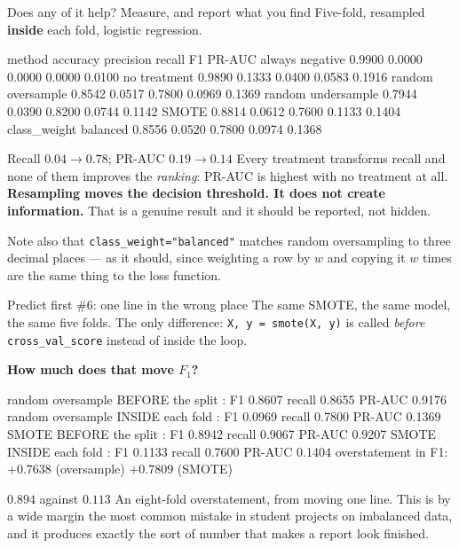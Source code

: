 \documentclass[aspectratio=169]{beamer}
\begin{document}
\begin{frame}[fragile,shrink=8]{Does any of it help? Measure, and report what you find}
Five-fold, resampled \textbf{inside} each fold, logistic regression.
\begin{outblk}
   method                 accuracy precision  recall      F1   PR-AUC
   always negative         0.9900    0.0000  0.0000  0.0000   0.0100
   no treatment            0.9890    0.1333  0.0400  0.0583   0.1916
   random oversample       0.8542    0.0517  0.7800  0.0969   0.1369
   random undersample      0.7944    0.0390  0.8200  0.0744   0.1142
   SMOTE                   0.8814    0.0612  0.7600  0.1133   0.1404
   class_weight balanced   0.8556    0.0520  0.7800  0.0974   0.1368
\end{outblk}
\begin{alertblock}{Recall $0.04 \rightarrow 0.78$; PR-AUC $0.19 \rightarrow 0.14$}
  \footnotesize Every treatment transforms recall and none of them improves
  the \emph{ranking}: PR-AUC is highest with no treatment at all.
  \textbf{Resampling moves the decision threshold. It does not create
  information.} That is a genuine result and it should be reported, not
  hidden.
\end{alertblock}
\begin{center}\small
  Note also that \texttt{class\_weight="balanced"} matches random
  oversampling to three decimal places --- as it should, since weighting a row
  by $w$ and copying it $w$ times are the same thing to the loss function.
\end{center}
\end{frame}

\begin{frame}[fragile,shrink=8]{Predict first \#6: one line in the wrong place}
The same SMOTE, the same model, the same five folds. The only difference:
\texttt{X, y = smote(X, y)} is called \emph{before} \texttt{cross\_val\_score}
instead of inside the loop.

\begin{center}
  \textbf{How much does that move $F_1$?}
\end{center}
\begin{outblk}
   random oversample  BEFORE the split : F1 0.8607  recall 0.8655  PR-AUC 0.9176
   random oversample  INSIDE each fold : F1 0.0969  recall 0.7800  PR-AUC 0.1369
   SMOTE              BEFORE the split : F1 0.8942  recall 0.9067  PR-AUC 0.9207
   SMOTE              INSIDE each fold : F1 0.1133  recall 0.7600  PR-AUC 0.1404
   overstatement in F1: +0.7638 (oversample)   +0.7809 (SMOTE)
\end{outblk}
\begin{alertblock}{$\mathbf{0.894}$ against $\mathbf{0.113}$}
  \footnotesize An eight-fold overstatement, from moving one line. This is by
  a wide margin the most common mistake in student projects on imbalanced
  data, and it produces exactly the sort of number that makes a report look
  finished.
\end{alertblock}
\end{frame}
\end{document}
